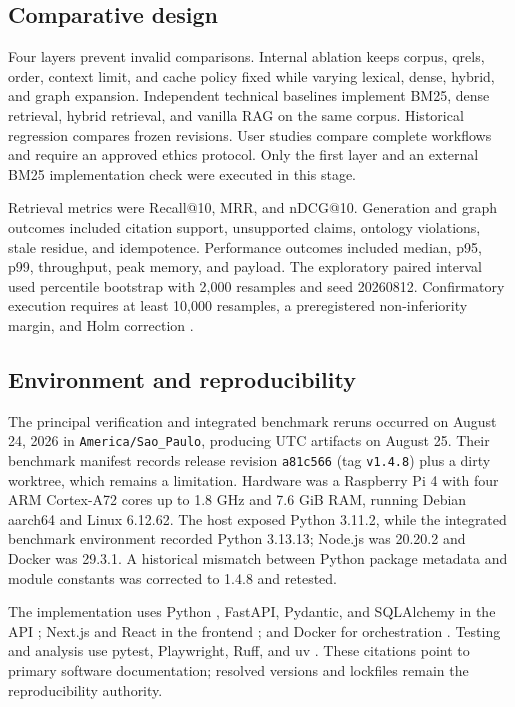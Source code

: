 \documentclass{sbc2023}
\newcommand{\code}[1]{\texttt{#1}}
\begin{document}
\subsection{Comparative design}

Four layers prevent invalid comparisons. Internal ablation keeps corpus, qrels, order, context
limit, and cache policy fixed while varying lexical, dense, hybrid, and graph expansion.
Independent technical baselines implement BM25, dense retrieval, hybrid retrieval, and vanilla RAG
on the same corpus. Historical regression compares frozen revisions. User studies compare complete
workflows and require an approved ethics protocol. Only the first layer and an external BM25
implementation check were executed in this stage.

Retrieval metrics were Recall@10, MRR, and nDCG@10. Generation and graph outcomes included citation
support, unsupported claims, ontology violations, stale residue, and idempotence. Performance
outcomes included median, p95, p99, throughput, peak memory, and payload. The exploratory paired
interval used percentile bootstrap with 2,000 resamples and seed 20260812. Confirmatory execution
requires at least 10,000 resamples, a preregistered non-inferiority margin, and Holm correction
\cite{efron1993bootstrap,holm1979procedure}.

\subsection{Environment and reproducibility}

The principal verification and integrated benchmark reruns occurred on August 24, 2026 in
\code{America/Sao\_Paulo}, producing UTC artifacts on August 25. Their benchmark manifest records
release revision \code{a81c566} (tag \code{v1.4.8}) plus a dirty worktree, which remains a
limitation. Hardware was a Raspberry Pi 4 with four ARM Cortex-A72 cores up to 1.8 GHz and
7.6 GiB RAM, running Debian aarch64 and Linux 6.12.62. The host exposed Python 3.11.2, while the
integrated benchmark environment recorded Python 3.13.13; Node.js was 20.20.2 and Docker was
29.3.1. A historical mismatch between Python package metadata and module constants was corrected
to 1.4.8 and retested.

The implementation uses Python \cite{python}, FastAPI, Pydantic, and SQLAlchemy in the API
\cite{fastapi,pydantic,sqlalchemy}; Next.js and React in the frontend \cite{nextjs,react}; and
Docker for orchestration \cite{docker}. Testing and analysis use pytest, Playwright, Ruff, and uv
\cite{pytest,playwright,ruff,uv}. These citations point to primary software documentation;
resolved versions and lockfiles remain the reproducibility authority.
\end{document}

